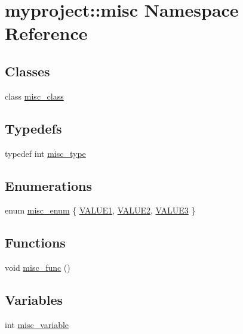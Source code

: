 \hypertarget{namespacemyproject_1_1misc}{}\section{myproject\+:\+:misc Namespace Reference}
\label{namespacemyproject_1_1misc}
\subsection*{Classes}
\begin{DoxyCompactItemize}
\item 
class \hyperlink{classmyproject_1_1misc_1_1misc__class}{misc\+\_\+class}
\end{DoxyCompactItemize}
\subsection*{Typedefs}
\begin{DoxyCompactItemize}
\item 
typedef int \hyperlink{group__group__misc_gad226919cbe86fe93d4f5a89f25b1e4d8}{misc\+\_\+type}
\end{DoxyCompactItemize}
\subsection*{Enumerations}
\begin{DoxyCompactItemize}
\item 
enum \hyperlink{group__group__misc_gac1a03dcef3fb6ac7f3d70216d14d86ca}{misc\+\_\+enum} \{ \hyperlink{group__group__misc_ggac1a03dcef3fb6ac7f3d70216d14d86caad7805af80c7cf110f2733483a07253f3}{V\+A\+L\+U\+E1}, 
\hyperlink{group__group__misc_ggac1a03dcef3fb6ac7f3d70216d14d86caac856322c422ad039e47f8551b4bcfb77}{V\+A\+L\+U\+E2}, 
\hyperlink{group__group__misc_ggac1a03dcef3fb6ac7f3d70216d14d86caa8470a6b37c04b4c34d0bc41314c4556f}{V\+A\+L\+U\+E3}
 \}
\end{DoxyCompactItemize}
\subsection*{Functions}
\begin{DoxyCompactItemize}
\item 
void \hyperlink{group__group__misc_gaaa4821583880ea9cbde9a6e60d45b653}{misc\+\_\+func} ()
\end{DoxyCompactItemize}
\subsection*{Variables}
\begin{DoxyCompactItemize}
\item 
int \hyperlink{group__group__misc_gae3b777196b0b2a533b53782b85317144}{misc\+\_\+variable}
\end{DoxyCompactItemize}
